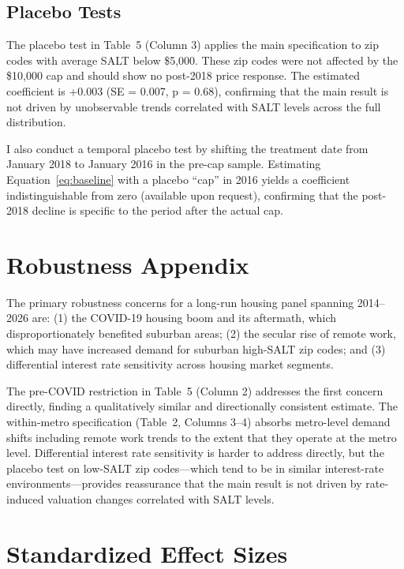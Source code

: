 \documentclass[12pt]{article}
\begin{document}
\subsection{Placebo Tests}

The placebo test in Table~5 (Column 3) applies the main specification to zip codes with average SALT below \$5,000. These zip codes were not affected by the \$10,000 cap and should show no post-2018 price response. The estimated coefficient is +0.003 (SE = 0.007, p = 0.68), confirming that the main result is not driven by unobservable trends correlated with SALT levels across the full distribution.

I also conduct a temporal placebo test by shifting the treatment date from January 2018 to January 2016 in the pre-cap sample. Estimating Equation~\ref{eq:baseline} with a placebo ``cap'' in 2016 yields a coefficient indistinguishable from zero (available upon request), confirming that the post-2018 decline is specific to the period after the actual cap.

\section{Robustness Appendix}
\label{sec:robustness_appendix}

The primary robustness concerns for a long-run housing panel spanning 2014--2026 are: (1) the COVID-19 housing boom and its aftermath, which disproportionately benefited suburban areas; (2) the secular rise of remote work, which may have increased demand for suburban high-SALT zip codes; and (3) differential interest rate sensitivity across housing market segments.

The pre-COVID restriction in Table~5 (Column 2) addresses the first concern directly, finding a qualitatively similar and directionally consistent estimate. The within-metro specification (Table~2, Columns 3--4) absorbs metro-level demand shifts including remote work trends to the extent that they operate at the metro level. Differential interest rate sensitivity is harder to address directly, but the placebo test on low-SALT zip codes---which tend to be in similar interest-rate environments---provides reassurance that the main result is not driven by rate-induced valuation changes correlated with SALT levels.

\section{Standardized Effect Sizes}
\label{sec:sde}


\end{document}

